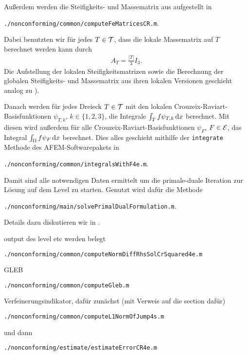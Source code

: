 Außerdem werden die Steifigkeits- und Massematrix aus
 aufgestellt in
\begin{center}
  \texttt{./nonconforming/common/computeFeMatricesCR.m}.
\end{center}
Dabei benutzten wir für jedes $T\in\mathcal{T}$, dass die lokale Massematrix auf
$T$ berechnet werden kann durch
\begin{align*}
  A_T
  =
  \frac{|T|}{3}I_3.
\end{align*}
Die Aufstellung der lokalen Steifigkeitsmatrizen sowie die Berechnung der
globalen Stei\-fig\-keits- und Massematrix aus ihren lokalen Versionen geschieht
analog zu \cite[Abschnitt 1.4.2]{CGKNRR10}).

Danach werden für jedes Dreieck $T\in\mathcal{T}$ mit den 
lokalen Crouzeix-Raviart-Basis\-funk\-tio\-nen $\psi_{T,k}$, $k\in\{1,2,3\}$,
die Integrale $ \int_T f\psi_{T,k}\,\mathrm{d}x$ berechnet. 
Mit diesen wird außerdem für alle Crouzeix-Raviart-Basisfunktionen
$\psi_F$, $F\in\mathcal{E}$, das Integral $\int_\Omega f\psi_F\,\mathrm{d}x$ berechnet.
Dies alles geschieht mithilfe der \texttt{integrate} Methode 
\cite[Abschnitt 1.8.2]{CGKNRR10} des AFEM-Softwarepakets in 
\begin{center}
  \texttt{./nonconforming/common/integralsWithF4e.m}.
\end{center}

Damit sind alle notwendigen Daten ermittelt um die primale-duale Iteration 
zur Lösung auf dem Level zu starten. Genutzt wird dafür die Methode
\begin{center}
  \texttt{./nonconforming/main/solvePrimalDualFormulation.m}.
\end{center}
Details dazu diskutieren wir in .

\bigskip output des level etc werden belegt

\bigskip
\begin{center}
  \texttt{./nonconforming/common/computeNormDiffRhsSolCrSquared4e.m}
\end{center}


\bigskip GLEB
\begin{center}
  \texttt{./nonconforming/common/computeGleb.m}
\end{center}

\bigskip  Verfeinerungsindikator, dafür zunächst (mit Verweis auf die section
dafür)
\begin{center}
  \texttt{./nonconforming/common/computeL1NormOfJump4s.m}
\end{center}
und dann 
\begin{center}
  \texttt{./nonconforming/estimate/estimateErrorCR4e.m}
\end{center}

